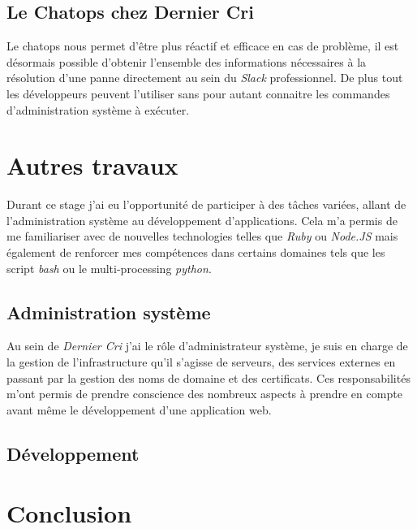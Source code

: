 \documentclass[12pt,a4paper]{article}
\begin{document}
  \newpage

  \subsection{Le Chatops chez Dernier
  Cri}\label{le-chatops-chez-dernier-cri}

  Le chatops nous permet d'être plus réactif et efficace en cas de
  problème, il est désormais possible d'obtenir l'ensemble des
  informations nécessaires à la résolution d'une panne directement au sein
  du \emph{Slack} professionnel. De plus tout les développeurs peuvent
  l'utiliser sans pour autant connaitre les commandes d'administration
  système à exécuter.

  \newpage

  \section{Autres travaux}\label{autres-travaux}

  Durant ce stage j'ai eu l'opportunité de participer à des tâches
  variées, allant de l'administration système au développement
  d'applications. Cela m'a permis de me familiariser avec de nouvelles
  technologies telles que \emph{Ruby} ou \emph{Node.JS} mais également de
  renforcer mes compétences dans certains domaines tels que les script
  \emph{bash} ou le multi-processing \emph{python}.

  \subsection{Administration système}\label{administration-systuxe8me}

  Au sein de \emph{Dernier Cri} j'ai le rôle d'administrateur système, je
  suis en charge de la gestion de l'infrastructure qu'il s'agisse de
  serveurs, des services externes en passant par la gestion des noms de
  domaine et des certificats. Ces responsabilités m'ont permis de prendre
  conscience des nombreux aspects à prendre en compte avant même le
  développement d'une application web.

  \subsection{Développement}\label{duxe9veloppement}

  \newpage

  \section{Conclusion}\label{conclusion}
\end{document}
